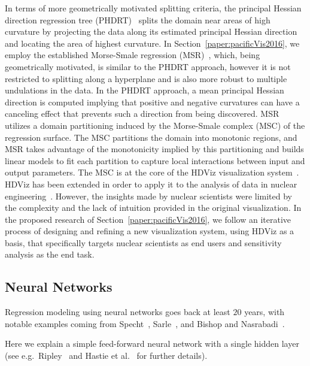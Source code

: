 In terms of more geometrically motivated splitting criteria, the principal Hessian direction regression tree (PHDRT)~\cite{LiLueChen2000} splits the domain near areas of high curvature by projecting the data along its estimated principal Hessian direction and locating the area of highest curvature.
%
In Section~\ref{paper:pacificVis2016}, we employ the established Morse-Smale regression (MSR)~\cite{GerberRubelBremer2011}, which, being geometrically motivated, is similar to the PHDRT approach, however it is not restricted to splitting along a hyperplane and is also more robust to multiple undulations in the data.
%
In the PHDRT approach, a mean principal Hessian direction is computed implying that positive and negative curvatures can have a canceling effect that prevents such a direction from being discovered.
%
MSR utilizes a domain partitioning induced by the Morse-Smale complex (MSC) of the regression surface.
%
The MSC partitions the domain into monotonic regions, and MSR takes advantage of the monotonicity implied by this partitioning and builds linear models to fit each partition to capture local interactions between input and output parameters.
%
The MSC is at the core of the HDViz visualization system~\cite{GerberBremerPascucci2010}.
%
HDViz has been extended in order to apply it to the analysis of data in nuclear engineering~\cite{MaljovecLiuWang2015,MaljovecWangMandelli2013a,MaljovecWangPascucci2013}.
%
However, the insights made by nuclear scientists were limited by the complexity and the lack of intuition provided in the original visualization.
%
In the proposed research of Section~\ref{paper:pacificVis2016}, we follow an iterative process of designing and refining a new visualization system, using HDViz as a basis, that specifically targets nuclear scientists as end users and sensitivity analysis as the end task.
%

\subsection{Neural Networks}
Regression modeling using neural networks goes back at least $20$ years, with notable examples coming from Specht~\cite{Specht1991}, Sarle~\cite{Sarle1994}, and Bishop and Nasrabadi~\cite{BishopNasrabadi2006}.

Here we explain a simple feed-forward neural network with a single hidden layer (see e.g.\ Ripley~\cite{Ripley1996} and Hastie et al.~\cite{HastieTibshiraniFriedman2008} for further details).

